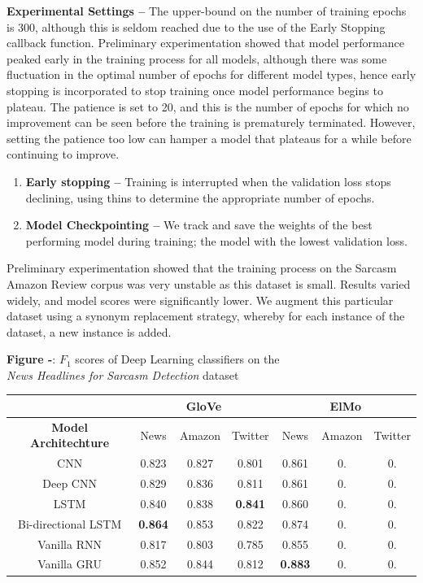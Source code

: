 \documentclass[12pt,a4paper]{article}
\begin{document}
\noindent \textbf{Experimental Settings --} The upper-bound on the number of training epochs is 300, although this is seldom reached due to the use of the Early Stopping callback function. Preliminary experimentation showed that model performance peaked early in the training process for all models, although there was some fluctuation in the optimal number of epochs for different model types, hence early stopping is incorporated to stop training once model performance begins to plateau. The patience is set to 20, and this is the number of epochs for which no improvement can be seen before the training is prematurely terminated. However, setting the patience too low can hamper a model that plateaus for a while before continuing to improve.

\begin{enumerate}
	\item \textbf{Early stopping --} Training is interrupted when the validation loss stops declining, using thins to determine the appropriate number of epochs.
	\item \textbf{Model Checkpointing --} We track and save the weights of the best performing model during training; the model with the lowest validation loss.
\end{enumerate}

Preliminary experimentation showed that the training process on the Sarcasm Amazon Review corpus was very unstable as this dataset is small. Results varied widely, and model scores were significantly lower. We augment this particular dataset using a synonym replacement strategy, whereby for each instance of the dataset, a new instance is added.


\begin{center}
	\textbf{Figure -}: $F_1$ scores of Deep Learning classifiers on the \\\textit{News Headlines for Sarcasm Detection} dataset
\end{center}

\begin{center}
	\begin{tabular}{|c|c|c|c|c|c|c|}
		\hline
		 &\multicolumn{3}{c|}{\textbf{GloVe}} & \multicolumn{3}{c|}{\textbf{ElMo}}\\
		 \hline
		\textbf{Model Architechture} &  News & Amazon & Twitter & News & Amazon & Twitter\\
		\hline\hline
		CNN   & 0.823 & 0.827 & 0.801 & 0.861& 0.& 0. \\
		Deep CNN   & 0.829 & 0.836 & 0.811 & 0.861& 0.& 0. \\
		LSTM & 0.840 & 0.838 & \textbf{0.841} & 0.860& 0.& 0. \\
		Bi-directional LSTM & \textbf{0.864} & 0.853 & 0.822 & 0.874& 0.& 0. \\
		Vanilla RNN & 0.817 & 0.803 & 0.785 & 0.855& 0.& 0. \\
		Vanilla GRU &0.852 & 0.844 & 0.812 & \textbf{0.883} & 0.& 0. \\
		\hline
	\end{tabular}
\end{center}
\end{document}
